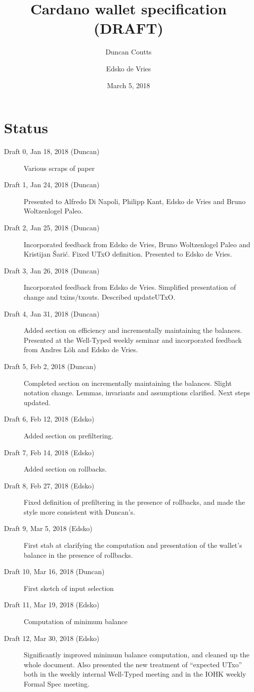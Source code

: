 \documentclass{article}
\begin{document}
\title{Cardano wallet specification (DRAFT)}
\author{Duncan Coutts \and Edsko de Vries}
\date{March 5, 2018}

\maketitle

\tableofcontents
\listoffigures

\section*{Status}

\begin{description}
\item[Draft 0, Jan 18, 2018 (Duncan)] Various scraps of paper
\item[Draft 1, Jan 24, 2018 (Duncan)] Presented to Alfredo Di Napoli, Philipp Kant,
     Edsko de Vries and Bruno Woltzenlogel Paleo.
\item[Draft 2, Jan 25, 2018 (Duncan)] Incorporated feedback from Edsko de Vries,
     Bruno Woltzenlogel Paleo and Kristijan \v{S}ari\'{c}. Fixed UTxO
     definition. Presented to Edsko de Vries.
\item[Draft 3, Jan 26, 2018 (Duncan)] Incorporated feedback from Edsko de Vries.
     Simplified presentation of change and txins/txouts. Described updateUTxO.
\item[Draft 4, Jan 31, 2018 (Duncan)] Added section on efficiency and incrementally
     maintaining the balances. Presented at the Well-Typed weekly seminar and
     incorporated feedback from Andres L\"oh and Edsko de Vries.
\item[Draft 5, Feb 2, 2018 (Duncan)] Completed section on incrementally maintaining the
     balances. Slight notation change. Lemmas, invariants and assumptions
     clarified. Next steps updated.
\item[Draft 6, Feb 12, 2018 (Edsko)] Added section on prefiltering.
\item[Draft 7, Feb 14, 2018 (Edsko)] Added section on rollbacks.
\item[Draft 8, Feb 27, 2018 (Edsko)] Fixed definition of prefiltering in the presence
     of rollbacks, and made the style more consistent with Duncan's.
\item[Draft 9, Mar 5, 2018 (Edsko)] First stab at clarifying the computation and
     presentation of the wallet's balance in the presence of rollbacks.
\item[Draft 10, Mar 16, 2018 (Duncan)] First sketch of input selection
\item[Draft 11, Mar 19, 2018 (Edsko)] Computation of minimum balance
\item[Draft 12, Mar 30, 2018 (Edsko)] Significantly improved minimum balance computation,
     and cleaned up the whole document. Also presented the new treatment of ``expected UTxo''
     both in the weekly internal Well-Typed meeting and in the IOHK weekly Formal Spec meeting.
\end{description}
\end{document}
